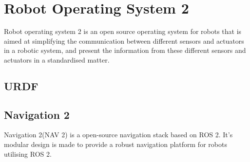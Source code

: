 \section{Robot Operating System 2}
Robot operating system 2 is an open source operating system for robots that is aimed at simplifying the communication between different sensors and actuators in a robotic system, and present the information from these different sensors and actuators in a standardised matter.

\subsection{URDF}


\subsection{Navigation 2}
Navigation 2(NAV 2) is a open-source navigation stack based on ROS 2. It's modular design is made to provide a robust navigation platform for robots utilising ROS 2.

